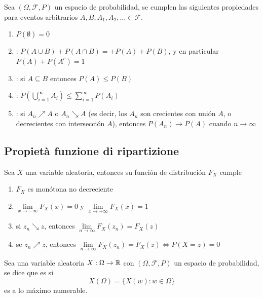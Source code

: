 \begin{teo}
    Sea $(\Omega, \mathcal{F}, P)$ un espacio de probabilidad, se cumplen las siguientes propiedades para eventos arbitrarios $A, B, A_1, A_2, \dots \in \mathcal{F}$.
    \begin{enumerate}[label=(\alph*)]
        \item $P(\emptyset)=0$
        \item {}: $P(A\cup B) + P(A\cap B)=+P(A)+P(B)$, y en particular $P(A)+P(A^c)=1$
        \item {}: si $A\subseteq B$ entonces $P(A)\leq P(B)$
        \item {}: $P\left(\bigcup\limits_{i=1}^{\infty} A_i\right) \leq \sum\limits_{i=1}^{\infty} P(A_i)$
        \item {}: si $A_n \nearrow A$ o $A_n \searrow A$ (es decir, los $A_n$ son crecientes con unión $A$, o decrecientes con intersección $A$), entonces $P(A_n) \to P(A)$ cuando $n\to \infty$
    \end{enumerate}
\end{teo}

\subsection{Propietà funzione di ripartizione}

\begin{prop}
    Sea $X$ una variable aleatoria, entonces su función de distribución $F_X$ cumple
    \begin{enumerate}[label=\arabic*)]
        \item $F_X$ es monótona no decreciente
        \item $\lim\limits_{x\to -\infty} F_X(x) = 0$ y $\lim\limits_{x\to +\infty} F_X(x) = 1$
        \item si $z_n \searrow z$, entonces $\lim\limits_{n\to \infty} F_X(z_n) = F_X(z)$
        \item se $z_n \nearrow z$, entonces $\lim\limits_{n\to \infty} F_X(z_n) = F_X(z) \Longleftrightarrow P(X=z)=0$
    \end{enumerate}
\end{prop}

\begin{definicion}
    Sea una variable aleatoria $X:\Omega\to \mathbb{R}$ con $(\Omega, \mathcal{F},P)$ un espacio de probabilidad, se dice que es  si 
    $$ X(\Omega)=\{X(w): w\in \Omega\}$$
    es a lo máximo numerable.
    
\end{definicion}

